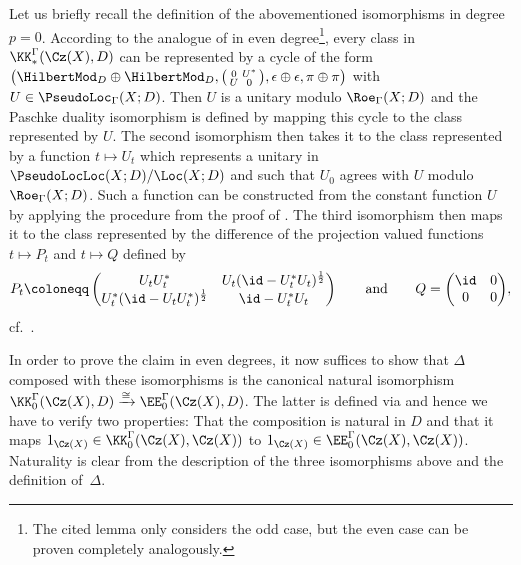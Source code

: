 Let us briefly recall the definition of the abovementioned isomorphisms in degree $p=0$.
According to the analogue of \cite[Lemma B.7]{GueWillYu_DyncomplKtheory} in even degree\footnote{The cited lemma only considers the odd case, but the even case can be proven completely analogously.}, every class in $\KK_*^\Gamma(\Cz(X),D)$ can be represented by a cycle of the form $\left(\HilbertMod_D\oplus\HilbertMod_D,\left(\begin{smallmatrix}0&U^*\\U&0\end{smallmatrix}\right)\!,\epsilon\oplus\epsilon,\pi\oplus\pi\right)$ with $U\in \PseudoLoc_\Gamma(X;D)$.
Then $U$ is a unitary modulo $\Roe_\Gamma(X;D)$ and the Paschke duality isomorphism is defined by mapping this cycle to the class represented by $U$. The second isomorphism then takes it to the class represented by a function $t\mapsto U_t$ which represents a unitary in $\PseudoLocLoc(X;D)/\Loc(X;D)$ and such that $U_0$ agrees with $U$ modulo $\Roe_\Gamma(X;D)$. Such a function can be constructed from the constant function $U$ by applying the procedure from the proof of \cite[Lemma~B.15]{GueWillYu_DyncomplKtheory}.
The third isomorphism then maps it to the class represented by the difference of the projection valued functions $t\mapsto P_t$ and $t\mapsto Q$ defined by
\[
P_t\coloneqq \begin{pmatrix}U_tU_t^*&U_t(\id-U_t^*U_t)^{\frac12} \\U_t^*(\id-U_tU_t^*)^{\frac12}&\id-U_t^*U_t\end{pmatrix}\qquad\text{and}\qquad Q=\begin{pmatrix}\id&0\\0&0\end{pmatrix}\!,
\]
cf.\ \cite[Proposition~4.8.10]{HigRoe}.

In order to prove the claim in even degrees, it now suffices to show that $\Delta$ composed with these isomorphisms is the canonical natural isomorphism $\KK_0^\Gamma(\Cz(X),D)\xrightarrow{\cong}\EE_0^\Gamma(\Cz(X),D)$.
The latter is defined via \cite[Theorem~2.2]{Thomsen_univKK} and hence we have to verify two properties: That the composition is natural in $D$ and that it maps $1_{\Cz(X)}\in\KK_0^\Gamma(\Cz(X),\Cz(X))$ to $1_{\Cz(X)}\in\EE_0^\Gamma(\Cz(X),\Cz(X))$. Naturality is clear from the description of the three isomorphisms above and the definition of~$\Delta$.

